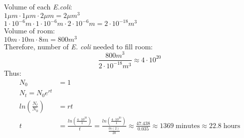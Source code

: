 \documentclass{article}
\newcommand{\note}[1]{\colorbox{gray!30}{#1}}
\newcommand{\ind}{\-\hspace{1cm}}
\begin{document}
\vspace{1cm}
\note{Volume of each \emph{E.coli}:}\\
\ind $1\mu m \cdot 1\mu m \cdot 2\mu m = 2\mu m^3$ \\
\ind $ 1\cdot 10^{-6}m \cdot 1\cdot 10^{-6}m \cdot 2\cdot 10^{-6}m = 2 \cdot 10^{-18}m^3$\\
\note{Volume of room:}\\
\ind $10 m \cdot 10 m \cdot 8 m = 800m^3$\\
\note{Therefore, number of \emph{E. coli} needed to fill room:}\\
\begin{equation*}
	\frac{800 m^3}{2 \cdot 10^{-18} m^3}\approx 4 \cdot 10^{20}
\end{equation*}
\note{Thus:}\\
\begin{align*}
	N_0&=1\\
	N_t=N_0 e^{rt}\\
	ln\left(\frac{N_t}{N_0}\right)&=rt\\
	t&=\frac{ln \left(\frac{4\cdot 10^{20}}{1}\right)}{t}=\frac{ln \left(\frac{4\cdot 10^{20}}{1}\right)}{\frac{ln(2)}{20}} \approx \frac{47.438}{0.035} \approx 1369 \; \text{minutes} \approx 22.8 \; \text{hours}
\end{align*}
\end{document}

